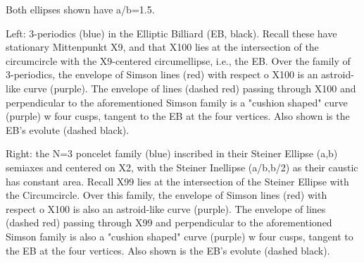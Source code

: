 Both ellipses shown have a/b=1.5.

Left: 3-periodics (blue) in the Elliptic Billiard (EB, black). Recall these have stationary Mittenpunkt X9, and that X100 lies at the intersection of the circumcircle with the X9-centered circumellipse, i.e., the EB. Over the family of 3-periodics, the envelope of Simson lines (red) with respect o X100 is an astroid-like curve (purple). The envelope of lines (dashed red) passing through X100 and perpendicular to the aforementioned Simson family is a "cushion shaped" curve (purple) w four cusps, tangent to the EB at the four vertices. Also shown is the EB's evolute (dashed black).

Right: the N=3 poncelet family (blue) inscribed in their Steiner Ellipse (a,b) semiaxes and centered on X2, with the Steiner Inellipse (a/b,b/2) as their caustic has constant area. Recall X99 lies at the intersection of the Steiner Ellipse with the Circumcircle. Over this family, the envelope of Simson lines (red) with respect o X100 is also an astroid-like curve (purple). The envelope of lines (dashed red) passing through X99 and perpendicular to the aforementioned Simson family is also a "cushion shaped" curve (purple) w four cusps, tangent to the EB at the four vertices. Also shown is the EB's evolute (dashed black).